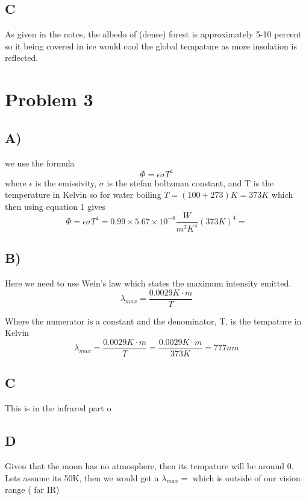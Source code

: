 \documentclass[12pt]{article}
\begin{document}
\subsection*{C}
As given in the notes, the albedo of (dense) forest is approximately 5-10 percent so it being covered in ice would cool the global tempature as more insolation is reflected.
\section*{Problem 3}
\subsection*{A)}
we use the formula 
\begin{equation}
    \Phi = \epsilon \sigma T^4
\end{equation}
where $\epsilon$ is the emissivity, $\sigma$ is the stefan boltzman constant, and T is the temperature in Kelvin so for water boiling $T=\left(100+273\right)K =373K$ which then using equation 1 gives
\begin{equation*}
    \Phi = \epsilon \sigma T^4 = 0.99 \times 5.67\times 10^{-8}\frac{W}{m^2K^4} \left(373K\right)^4 = 
\end{equation*}
\subsection*{B)}
Here we need to use Wein's law which states the maximum intensity emitted.
\begin{equation}
    \lambda_{max} = \frac{0.0029K \cdot m}{T}
\end{equation}

Where the numerator is a constant and the denominator, T, is the tempature in Kelvin
\begin{equation*}
    \lambda_{max} = \frac{0.0029K \cdot m}{T} = \frac{0.0029K \cdot m}{373K} = 777nm
\end{equation*}
\subsection*{C}
This is in the infrared part o

\subsection*{D}
Given that the moon has no atmosphere, then its tempature will be around 0. Lets assume its 50K, then we would get a $\lambda_{max} = $ which is outside of our vision range ( far IR)
\end{document}
